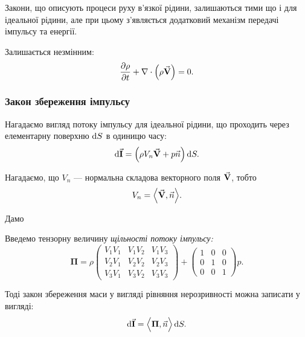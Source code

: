 Закони, що описують процеси руху в'язкої рідини, залишаються тими що і для ідеальної рідини, але при цьому з'являється додатковий механізм передачі імпульсу та енергії. \medskip

\begin{law}
	Залишається незмінним:
	\begin{equation}
		\frac{\partial \rho}{\partial t} + \nabla \cdot \Big(\rho {\vec{\mathbf{V}}}\Big) = 0.		
	\end{equation}
\end{law}

\subsubsection{Закон збереження імпульсу}

Нагадаємо вигляд потоку імпульсу для ідеальної рідини, що проходить через елементарну поверхню $\mathop{}\!\mathrm{d} S$ в одиницю часу:
\begin{equation}
	\mathop{}\!\mathrm{d} {\vec{\mathbf{I}}} = \Big(\rho V_n {\vec{\mathbf{V}}} + p \vec n \Big) \mathop{}\!\mathrm{d} S.
\end{equation}

\begin{remark}
	Нагадаємо, що $V_n$ --- нормальна складова векторного поля ${\vec{\mathbf{V}}}$, тобто
	\begin{equation}
		V_n = \Big\langle {\vec{\mathbf{V}}}, \vec n \Big\rangle.
	\end{equation}
\end{remark}

Дамо
\begin{definition}
	Введемо тензорну величину \it{щільності потоку імпульсу}:
	\begin{equation}
		\bm{\Pi} = \rho 
		\begin{pmatrix}
			V_1 V_1 & V_1 V_2 & V_1 V_3 \\
			V_2 V_1 & V_2 V_2 & V_2 V_3 \\
			V_3 V_1 & V_3 V_2 & V_3 V_3
		\end{pmatrix}
		+
		\begin{pmatrix}
			1 & 0 & 0 \\
			0 & 1 & 0 \\
			0 & 0 & 1
		\end{pmatrix}
		p.
	\end{equation}
\end{definition}

Тоді закон збереження маси у вигляді рівняння нерозривності можна записати у вигляді: 
\begin{equation}
	\mathop{}\!\mathrm{d} {\vec{\mathbf{I}}} = \Big\langle \bm{\Pi}, \vec n \Big\rangle \mathop{}\!\mathrm{d} S.
\end{equation}

